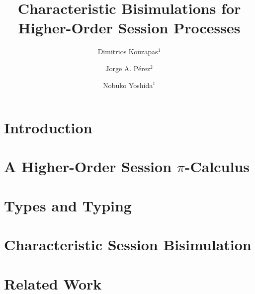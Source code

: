 \documentclass[a4paper,UKenglish]{lipics}
\title{Characteristic Bisimulations for Higher-Order Session Processes}
\author{Dimitrios Kouzapas$^{\text{1}}$}
\author{Jorge A. P\'{e}rez$^{\text{2}}$}
\author{Nobuko Yoshida$^{\text{1}}$}
\affil{1~~~ Imperial College London 
\qquad 
2~~~ University of Groningen}
\begin{document}
\maketitle




\section{Introduction}
\label{sec:intro}



%

\section{A Higher-Order Session $\pi$-Calculus}
\label{sec:calculus}


%
%

\section{Types and Typing}
\label{sec:types}


\section{Characteristic Session Bisimulation}
\label{sec:behavioural}





\section{Related Work}
\label{sec:relwork}

\end{document}
